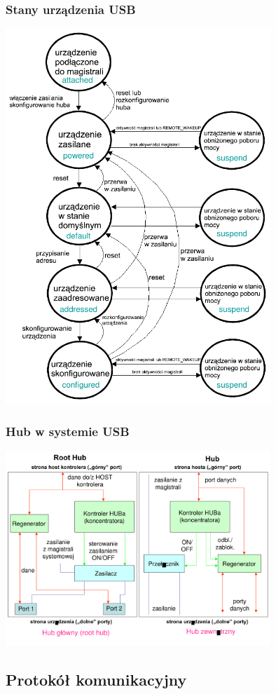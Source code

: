 		\subsubsection{Stany urządzenia USB}
		\includegraphics[width=10cm]{./wyklady/USB_16_1.pdf}
		\subsubsection{Hub w systemie USB}
		\includegraphics[width=10cm]{./wyklady/USB_17_1.pdf}
	
\subsection{Protokół komunikacyjny}
